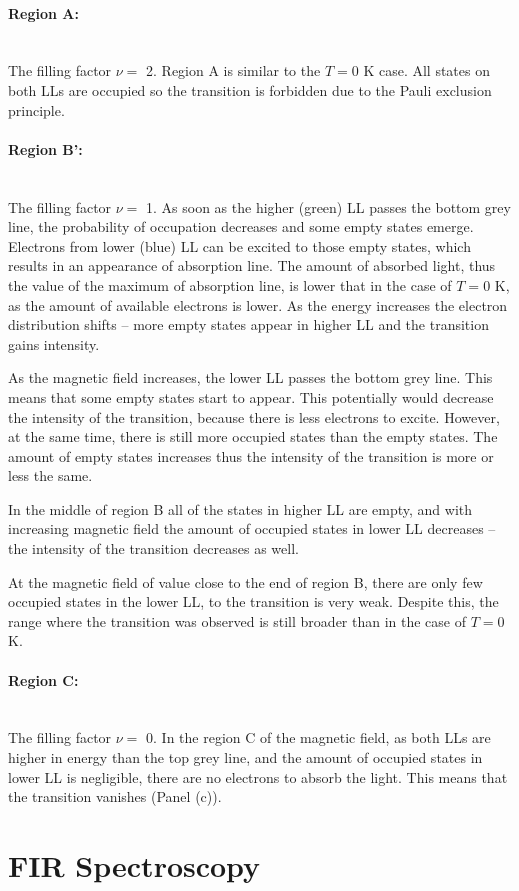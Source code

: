 \documentclass[titlepage,a4paper]{book}
\newcommand{\wciecie}{\quad\phantom{v}}
\newcommand{\myparagraph}[1]{\paragraph{#1}\mbox{}\\}
\begin{document}
\myparagraph{Region A:}
\wciecie
The filling factor $\nu =$ 2. Region A is similar to the $T = 0$ K case. All states on both LLs are occupied so the transition is forbidden due to the Pauli exclusion principle. 

\myparagraph{Region B':}
\wciecie
The filling factor $\nu =$ 1. As soon as the higher (green) LL passes the bottom grey line, the probability of occupation decreases and some empty states emerge. Electrons from lower (blue) LL can be excited to those empty states, which results in an appearance of absorption line. The amount of absorbed light, thus the value of the maximum of absorption line, is lower that in the case of $T = 0$ K, as the amount of available electrons is lower. As the energy increases the electron distribution shifts -- more empty states appear in higher LL and the transition gains intensity. 

As the magnetic field increases, the lower LL passes the bottom grey line. This means that some empty states start to appear. This potentially would decrease the intensity of the transition, because there is less electrons to excite. However, at the same time, there is still more occupied states than the empty states. The amount of empty states increases thus the intensity of the transition is more or less the same.

In the middle of region B all of the states in higher LL are empty, and with increasing magnetic field the amount of occupied states in lower LL decreases -- the intensity of the transition decreases as well.

At the magnetic field of value close to the end of region B, there are only few occupied states in the lower LL, to the transition is very weak. Despite this, the range where the transition was observed is still broader than in the case of $T = 0$ K.

\myparagraph{Region C:}
\wciecie
The filling factor $\nu =$ 0. In the region C of the magnetic field, as both LLs are higher in energy than the top grey line, and the amount of occupied states in lower LL is negligible, there are no electrons to absorb the light. This means that the transition vanishes (Panel (c)).

\section{FIR Spectroscopy}
\wciecie

\end{document}
